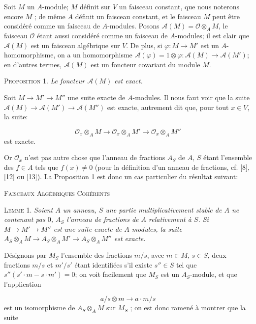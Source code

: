 Soit $M$ un $A$-module; $M$ définit sur $V$ un faisceau constant, que nous noterons encore $M$ ; de même $A$ définit un faisceau constant, et le faisceau $M$ peut être considéré comme un faisceau de $A$-modules. Posons $\mathcal{A}(M) = \mathcal{O} \otimes_A M$, le faisceau $\mathcal{O}$ étant aussi considéré comme un faisceau de $A$-modules; il est clair que $\mathcal{A}(M)$ est un faisceau algébrique sur $V$. De plus, si $\varphi : M \to M'$ est un $A$-homomorphisme, on a un homomorphisme $\mathcal{A}(\varphi) = 1 \otimes \varphi : \mathcal{A}(M) \to \mathcal{A}(M')$; en d'autres termes, $\mathcal{A}(M)$ est un foncteur covariant du module $M$.

\textsc{Proposition} 1. \textit{Le foncteur $\mathcal{A}(M)$ est exact.}

Soit $M \to M' \to M''$ une suite exacte de $A$-modules. Il nous faut voir que la suite $\mathcal{A}(M) \to \mathcal{A}(M') \to \mathcal{A}(M'')$ est exacte, autrement dit que, pour tout $x \in V$, la suite:

\begin{equation*}
\mathcal{O}_x \otimes_A M \to \mathcal{O}_x \otimes_A M' \to \mathcal{O}_x \otimes_A M''
\end{equation*}
est exacte.

Or $\mathcal{O}_x$ n'est pas autre chose que l'anneau de fractions $A_S$ de $A$, $S$ étant l'ensemble des $f \in A$ tels que $f(x) \neq 0$ (pour la définition d'un anneau de fractions, cf. [8], [12] ou [13]). La Proposition 1 est donc un cas particulier du résultat suivant:




\textsc{Faisceaux Algébriques Cohérents}

\textsc{Lemme} 1. \textit{Soient $A$ un anneau, $S$ une partie multiplicativement stable de $A$ ne contenant pas $0$, $A_S$ l'anneau de fractions de $A$ relativement à $S$. Si $M \to M' \to M''$ est une suite exacte de $A$-modules, la suite $A_S \otimes_A M \to A_S \otimes_A M' \to A_S \otimes_A M''$ est exacte.}

Désignons par $M_S$ l'ensemble des fractions $m/s$, avec $m \in M$, $s \in S$, deux fractions $m/s$ et $m'/s'$ étant identifiées s'il existe $s'' \in S$ tel que $s''(s' \cdot m - s \cdot m') = 0$; on voit facilement que $M_S$ est un $A_S$-module, et que l'application

\begin{equation*}
a/s \otimes m \to a \cdot m/s
\end{equation*}
est un isomorphisme de $A_S \otimes_A M$ sur $M_S$ ; on est donc ramené à montrer que la suite

